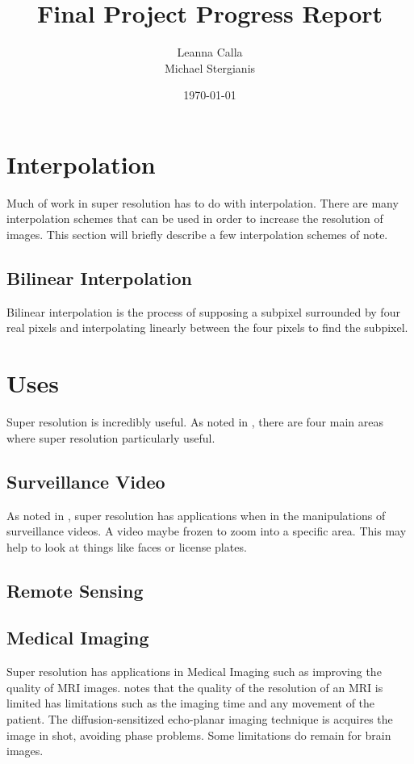\documentclass{article}
\title{Final Project Progress Report}
\author{Leanna Calla\\Michael Stergianis}
\date{\today}
\begin{document}
\maketitle
\section{Interpolation}
\label{sec:interpolation}
Much of work in super resolution has to do with interpolation.  There
are many interpolation schemes that can be used in order to increase
the resolution of images. This section will briefly describe a few
interpolation schemes of note.
%
\subsection{Bilinear Interpolation}
\label{subsec:bilinear}
Bilinear interpolation is the process of supposing a subpixel
surrounded by four real pixels and interpolating linearly between the
four pixels to find the subpixel.
%
%
\section{Uses}
\label{sec:uses}

Super resolution is incredibly useful. As noted in
\cite{Yang2010ImageSH}, there are four main areas where super
resolution particularly useful.
\subsection{Surveillance Video}
As noted in \cite{Yang2010ImageSH}, super resolution has applications
when in the manipulations of surveillance videos. A video maybe frozen
to zoom into a specific area. This may help to look at things like faces or license plates.
\subsection{Remote Sensing}

\subsection{Medical Imaging}
Super resolution has applications in Medical Imaging such as improving
the quality of MRI images. \cite{Peled} notes that the quality of the resolution of
an MRI is limited has limitations such as the imaging time and any
movement of the patient. The diffusion-sensitized echo-planar imaging
technique is acquires the image in shot, avoiding phase problems. Some
limitations do remain for brain images.  
\end{document}
